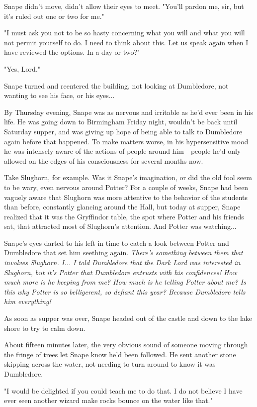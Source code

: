 Snape didn't move, didn't allow their eyes to meet. "You'll pardon me, sir, but it's ruled out one or two for me."

"I must ask you not to be so hasty concerning what you will and what you will not permit yourself to do. I need to think about this. Let us speak again when I have reviewed the options. In a day or two?"

"Yes, Lord."

Snape turned and reentered the building, not looking at Dumbledore, not wanting to see his face, or his eyes...

By Thursday evening, Snape was as nervous and irritable as he'd ever been in his life. He was going down to Birmingham Friday night, wouldn't be back until Saturday supper, and was giving up hope of being able to talk to Dumbledore again before that happened. To make matters worse, in his hypersensitive mood he was intensely aware of the actions of people around him - people he'd only allowed on the edges of his consciousness for several months now.

Take Slughorn, for example. Was it Snape's imagination, or did the old fool seem to be wary, even nervous around Potter? For a couple of weeks, Snape had been vaguely aware that Slughorn was more attentive to the behavior of the students than before, constantly glancing around the Hall, but today at supper, Snape realized that it was the Gryffindor table, the spot where Potter and his friends sat, that attracted most of Slughorn's attention. And Potter was watching...

Snape's eyes darted to his left in time to catch a look between Potter and Dumbledore that set him seething again. \emph{There's something between them that involves Slughorn. I... I told Dumbledore that the Dark Lord was interested in Slughorn, but it's Potter that Dumbledore entrusts with his confidences! How much more is he keeping from me? How much is he telling Potter about me? Is this why Potter is so belligerent, so defiant this year? Because Dumbledore tells him everything!}

As soon as supper was over, Snape headed out of the castle and down to the lake shore to try to calm down.

About fifteen minutes later, the very obvious sound of someone moving through the fringe of trees let Snape know he'd been followed. He sent another stone skipping across the water, not needing to turn around to know it was Dumbledore.

"I would be delighted if you could teach me to do that. I do not believe I have ever seen another wizard make rocks bounce on the water like that."

